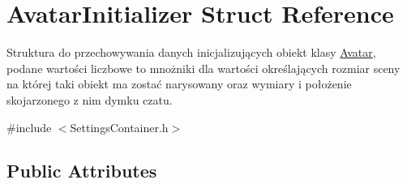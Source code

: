 \hypertarget{struct_avatar_initializer}{}\section{Avatar\+Initializer Struct Reference}
\label{struct_avatar_initializer}


Struktura do przechowywania danych inicjalizujących obiekt klasy \mbox{\hyperlink{class_avatar}{Avatar}}, podane wartości liczbowe to mnożniki dla wartości określających rozmiar sceny na której taki obiekt ma zostać narysowany oraz wymiary i położenie skojarzonego z nim dymku czatu.  




{\ttfamily \#include $<$Settings\+Container.\+h$>$}

\subsection*{Public Attributes}
